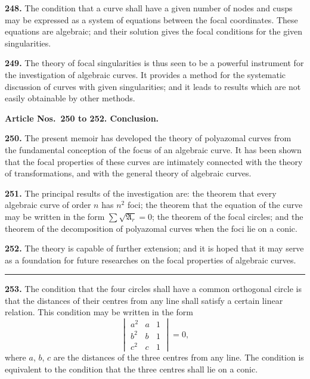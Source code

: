 \documentclass[12pt,a4paper]{article}
\theoremstyle{definition}
\begin{document}
\noindent\textbf{248.} The condition that a curve shall have a given number of nodes and cusps
may be expressed as a system of equations between the focal coordinates. These
equations are algebraic; and their solution gives the focal conditions for the given
singularities.

\noindent\textbf{249.} The theory of focal singularities is thus seen to be a powerful instrument
for the investigation of algebraic curves. It provides a method for the systematic
discussion of curves with given singularities; and it leads to results which are not
easily obtainable by other methods.

\vspace{0.5em}
\noindent\textbf{Article Nos.~250 to 252. Conclusion.}

\vspace{0.3em}
\noindent\textbf{250.} The present memoir has developed the theory of polyazomal curves from
the fundamental conception of the focus of an algebraic curve. It has been shown that
the focal properties of these curves are intimately connected with the theory of transformations,
and with the general theory of algebraic curves.

\noindent\textbf{251.} The principal results of the investigation are: the theorem that every
algebraic curve of order $n$ has $n^2$ foci; the theorem that the equation of the curve may
be written in the form $\sum\sqrt{\mathfrak{A}_r} = 0$; the theorem of the focal circles; and the theorem
of the decomposition of polyazomal curves when the foci lie on a conic.

\noindent\textbf{252.} The theory is capable of further extension; and it is hoped that it may
serve as a foundation for future researches on the focal properties of algebraic curves.

\vspace{1em}
\begin{center}
\rule{0.5\textwidth}{0.4pt}
\end{center}

\newpage
\noindent\textbf{253.} The condition that the four circles shall have a common orthogonal
circle is that the distances of their centres from any line shall satisfy a certain linear
relation. This condition may be written in the form
\[
\begin{vmatrix}
a^2 & a & 1 \\
b^2 & b & 1 \\
c^2 & c & 1
\end{vmatrix}
= 0,
\]
where $a$, $b$, $c$ are the distances of the three centres from any line. The condition is
equivalent to the condition that the three centres shall lie on a conic.
\end{document}
